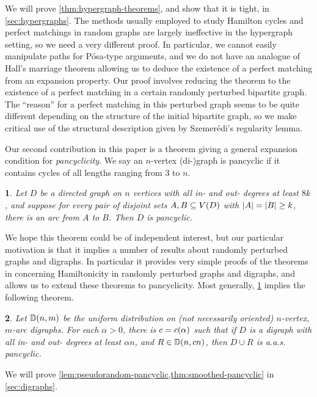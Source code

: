 \documentclass[11pt,english]{article}
\theoremstyle{plain}
\newtheorem{thm}{\protect\theoremname}
\theoremstyle{definition}
\theoremstyle{definition}
\theoremstyle{plain}
\theoremstyle{plain}
\theoremstyle{plain}
\theoremstyle{plain}
\theoremstyle{remark}
\theoremstyle{remark}
\let\originalleft\left
\let\originalright\right
\renewcommand{\left}{\mathopen{}\mathclose\bgroup\originalleft}
\renewcommand{\right}{\aftergroup\egroup\originalright}
\providecommand{\theoremname}{Theorem}
\begin{document}
We will prove \ref{thm:hypergraph-theorems}, and show that it is
tight, in \ref{sec:hypergraphs}. The methods usually employed to
study Hamilton cycles and perfect matchings in random graphs are largely
ineffective in the hypergraph setting, so we need a very different
proof. In particular, we cannot easily manipulate paths for P\'osa-type
arguments, and we do not have an analogue of Hall's marriage theorem
allowing us to deduce the existence of a perfect matching from an
expansion property. Our proof involves reducing the theorem to the
existence of a perfect matching in a certain randomly perturbed bipartite
graph. The ``reason'' for a perfect matching in this perturbed graph
seems to be quite different depending on the structure of the initial
bipartite graph, so we make critical use of the structural description
given by Szemer\'edi's regularity lemma.

Our second contribution in this paper is a theorem giving a general
expansion condition for\emph{ pancyclicity}. We say an $n$-vertex
\mbox{(di-)}graph is pancyclic if it contains cycles of all lengths
ranging from 3 to $n$.
\begin{thm}
\label{lem:pseudorandom-pancyclic}Let $D$ be a directed graph on
$n$ vertices with all in- and out- degrees at least $8k$, and suppose
for every pair of disjoint sets $A,B\subseteq V\left(D\right)$ with $\left|A\right|=\left|B\right|\ge k$,
there is an arc from $A$ to $B$. Then $D$ is pancyclic.
\end{thm}
We hope this theorem could be of independent interest, but our particular
motivation is that it implies a number of results about randomly perturbed
graphs and digraphs. In particular it provides very simple proofs
of the theorems in \cite{BFM03} concerning Hamiltonicity in randomly
perturbed graphs and digraphs, and allows us to extend these theorems
to pancyclicity. Most generally, \ref{lem:pseudorandom-pancyclic} implies the following theorem.

\begin{thm}
\label{thm:smoothed-pancyclic}Let $\DD\left(n,m\right)$ be the uniform
distribution on (not necessarily oriented) $n$-vertex, $m$-arc digraphs.
For each $\alpha>0$, there is $\cdi=\cdi\left(\alpha\right)$ such that
if $D$ is a digraph with all in- and out- degrees at least $\alpha n$,
and $R\in\DD\left(n,\cdi n\right)$, then $D\cup R$
is a.a.s. pancyclic.
\end{thm}

We will prove \ref{lem:pseudorandom-pancyclic,thm:smoothed-pancyclic} in  \ref{sec:digraphs}.
\end{document}
